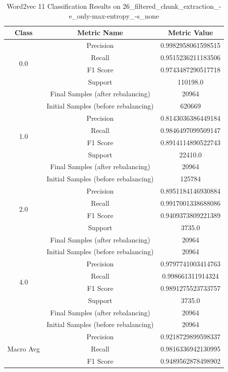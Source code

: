 \begin{longtable}{|c|c|c|}
\caption{Word2vec 11 Classification Results on 26\_filtered\_chunk\_extraction\_-e\_only-max-entropy\_-s\_none} \label{tab:26_filtered_chunk_extraction_-e_only-max-entropy_-s_none_word2vec_11_classifiers_results} \\
\hline
Class & Metric Name & Metric Value \\
\hline
\multirow{4}{*}{0.0} & Precision & 0.9982958061598515 \\
 & Recall & 0.9515236211183506 \\
 & F1 Score & 0.9743487290517718 \\
 & Support & 110198.0 \\
 & Final Samples (after rebalancing) & 20964 \\
 & Initial Samples (before rebalancing) & 620669 \\
\hline
\multirow{4}{*}{1.0} & Precision & 0.8143036386449184 \\
 & Recall & 0.9846497099509147 \\
 & F1 Score & 0.8914114890522743 \\
 & Support & 22410.0 \\
 & Final Samples (after rebalancing) & 20964 \\
 & Initial Samples (before rebalancing) & 125784 \\
\hline
\multirow{4}{*}{2.0} & Precision & 0.8951184146930884 \\
 & Recall & 0.9917001338688086 \\
 & F1 Score & 0.9409373809221389 \\
 & Support & 3735.0 \\
 & Final Samples (after rebalancing) & 20964 \\
 & Initial Samples (before rebalancing) & 20964 \\
\hline
\multirow{4}{*}{4.0} & Precision & 0.9797741003414763 \\
 & Recall & 0.998661311914324 \\
 & F1 Score & 0.9891275523733757 \\
 & Support & 3735.0 \\
 & Final Samples (after rebalancing) & 20964 \\
 & Initial Samples (before rebalancing) & 20964 \\
\hline
\multirow{4}{*}{Macro Avg} & Precision & 0.9218729899598337 \\
 & Recall & 0.9816336942130995 \\
 & F1 Score & 0.9489562878498902 \\

\end{longtable}
